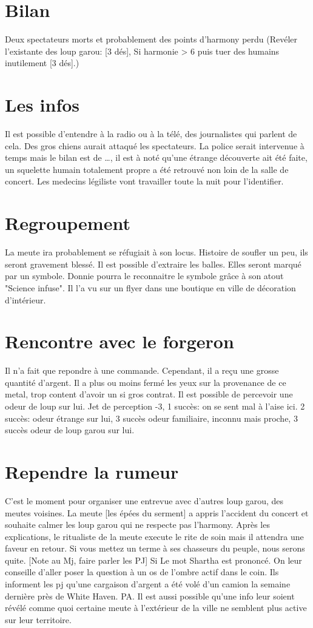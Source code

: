 \documentclass[oneside,12pt]{book}
\begin{document}
\begin{flushleft}
\section{Bilan}
Deux spectateurs morts et probablement des points d'harmony perdu (Revéler l'existante des loup garou: [3 dés], Si harmonie > 6 puis tuer des humains inutilement [3 dés].) 

\section{Les infos }
Il est possible d'entendre à la radio ou à la télé, des journalistes qui parlent de cela. 
Des gros chiens aurait attaqué les spectateurs. La police serait intervenue à temps mais le bilan est de …, il est à noté qu'une étrange découverte ait été faite, un squelette humain totalement 
propre a été retrouvé non loin de la salle de concert. Les medecins légiliste vont travailler toute la nuit pour l'identifier. 



\section{Regroupement}
La meute ira probablement se réfugiait à son locus. Histoire de soufler un peu, ils seront gravement blessé. Il est possible 
d'extraire les balles. Elles seront marqué par un symbole.  Donnie pourra le reconnaitre le symbole grâce à son atout "Science 
infuse". Il l'a vu sur un flyer dans une boutique en ville de décoration d'intérieur. 


\section{Rencontre avec le forgeron}
Il n'a fait que repondre à une commande. Cependant, il a reçu une grosse quantité d'argent. 
Il a plus ou moins fermé les yeux sur la provenance de ce metal, trop content d'avoir un si gros contrat.
Il est possible de percevoir une odeur de loup sur lui.
Jet de perception -3, 1 succès: on se sent mal à l'aise ici. 2 succès: odeur étrange sur lui, 3 succès odeur familiaire, inconnu mais proche, 3 succès odeur de loup garou sur lui. 

\section{Rependre la rumeur}
C'est le moment pour organiser une entrevue avec d'autres loup garou, des meutes voisines. 
La meute [les épées du serment] a appris l'accident du concert et souhaite calmer les loup garou qui ne respecte pas l'harmony. 
Après les explications, le ritualiste de la meute execute le rite de soin mais il attendra une faveur en retour. 
Si vous mettez un terme à ses chasseurs du peuple, nous serons quite. [Note au Mj, faire parler les PJ]
Si Le mot Shartha est prononcé. On leur conseille d'aller poser la question à un os de l'ombre actif dans le coin. 
Ils informent les pj qu'une cargaison d'argent a été volé d'un camion la semaine dernière près de White Haven. PA. Il est aussi possible qu'une info leur soient révélé comme quoi certaine meute à l'extérieur de la ville ne semblent plus active sur leur territoire. 



\end{flushleft}
\end{document}
